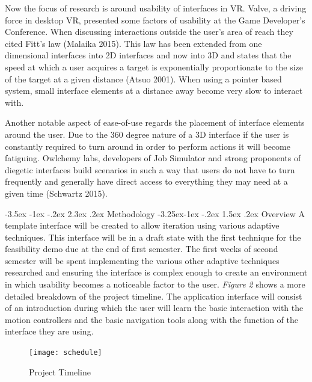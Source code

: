 \documentclass[9pt,twocolumn]{article}
\makeatletter
\renewcommand{\section}{\@startsection {section}{1}{\z@}%
             {-3.5ex \@plus -1ex \@minus -.2ex}%
             {2.3ex \@plus .2ex}%
             {\normalfont\Large\scshape\bfseries}}
\renewcommand{\subsection}{\@startsection{subsection}{2}{\z@}%
             {-3.25ex\@plus -1ex \@minus -.2ex}%
             {1.5ex \@plus .2ex}%
             {\normalfont\large\scshape\bfseries}}
\makeatother
\begin{document}
Now the focus of research is around usability of interfaces in VR. Valve, a driving force in desktop VR, presented some factors of usability at the Game Developer's Conference. When discussing interactions outside the user's area of reach they cited Fitt's law (Malaika 2015). This law has been extended from one dimensional interfaces into 2D interfaces and now into 3D and states that the speed at which a user acquires a target is exponentially proportionate to the size of the target at a given distance (Atsuo 2001). When using a pointer based system, small interface elements at a distance away become very slow to interact with. 

Another notable aspect of ease-of-use regards the placement of interface elements around the user. Due to the 360 degree nature of a 3D interface if the user is constantly required to turn around in order to perform actions it will become fatiguing. Owlchemy labs, developers of Job Simulator and strong proponents of diegetic interfaces build scenarios in such a way that users do not have to turn frequently and generally have direct access to everything they may need at a given time (Schwartz 2015).

\section{Methodology}
\subsection{Overview}
A template interface will be created to allow iteration using various adaptive techniques. This interface will be in a draft state with the first technique for the feasibility demo due at the end of first semester. The first weeks of second semester will be spent implementing the various other adaptive techniques researched and ensuring the interface is complex enough to create an environment in which usability becomes a noticeable factor to the user. \emph{Figure 2} shows a more detailed breakdown of the project timeline. The application interface will consist of an introduction during which the user will learn the basic interaction with the motion controllers and the basic navigation tools along with the function of the interface they are using.

\begin{figure}
\centering
\texttt{[image: schedule]}
\caption{Project Timeline}
\end{figure}
\end{document}
